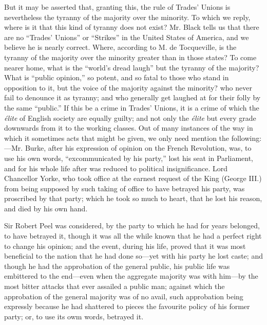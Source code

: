 But it may be asserted that, granting this, the rule of Trades' Unions
is nevertheless the tyranny of the majority over the minority. To which
we reply, where is it that this kind of tyranny does not exist? Mr.
Black tells us that there are no ``Trades' Unions'' or ``Strikes'' in
the United States of America, and we believe he is nearly correct.
Where, according to M. de Tocqueville, is the tyranny of the majority
over the minority greater than in those states? To come nearer home,
what is the ``world's dread laugh'' but the tyranny of the majority?
What is ``public opinion,'' so potent, and so fatal to those who stand
in opposition to it, but the voice of the majority against the minority?
who never fail to denounce it as tyranny; and who generally get laughed
at for their folly by the same ``public.'' If this be a crime in Trades'
Unions, it is a crime of which the \textit{élite} of English society are
equally guilty; and not only the \textit{élite} but every grade
downwards from it to the working classes. Out of many instances of the
way in which it sometimes acts that might be given, we only need mention
the following:---Mr. Burke, after his expression of opinion on the
French Revolution, was, to use his own words, ``excommunicated by his
party,'' lost his seat in Parliament, and for his whole life after was
reduced to political insignificance. Lord Chancellor Yorke, who took
office at the earnest request of the King (George III.) from being
supposed by such taking of office to have betrayed his party, was
proscribed by that party; which he took so much to heart, that he lost
his reason, and died by his own hand.

Sir Robert Peel was considered, by the party to which he had for years
belonged, to have betrayed it, though it was all the while known that he
had a perfect right to change his opinion; and the event, during his
life, proved that it was most beneficial to the nation that he had done
so---yet with his party he lost caste; and though he had the approbation
of the general public, his public life was embittered to the end---even
when the aggregate majority was with him---by the most bitter attacks
that ever assailed a public man; against which the approbation of the
general majority was of no avail, such approbation being expressly
because he had shattered to pieces the favourite policy of his former
party; or, to use its owm words, betrayed it.


